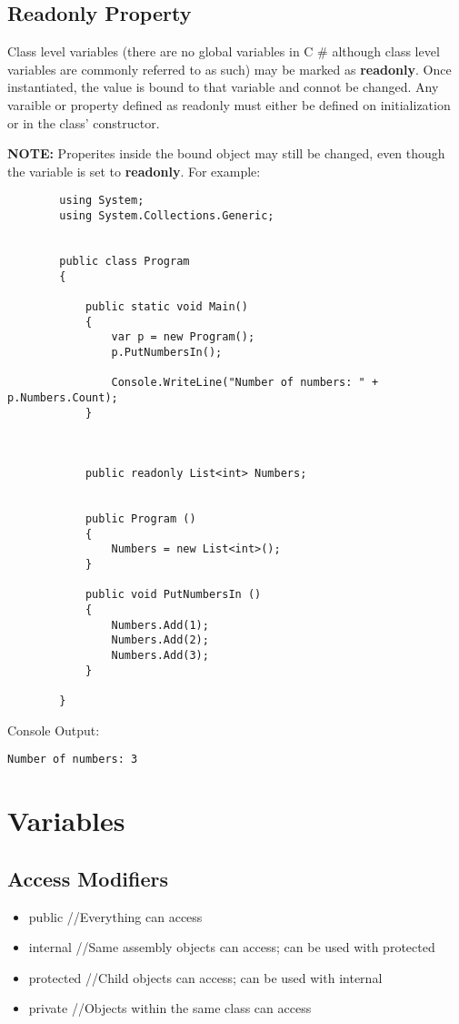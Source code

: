 \documentclass {amsart}
\begin{document}
	\subsection{Readonly Property}  Class level variables (there are no global variables in C \# although class level variables are commonly referred to as such) may be marked as {\bf readonly}.  Once instantiated, the value is bound to that variable and connot be changed.  Any varaible or property defined as readonly must either be defined on initialization or in the class' constructor.
\linebreak

{\bf NOTE:} Properites inside the bound object may still be changed, even though the variable is set to {\bf readonly}.  For example: 

	\begin{lstlisting}
		using System;
		using System.Collections.Generic;

							
		public class Program
		{

			public static void Main()
			{
				var p = new Program();
				p.PutNumbersIn();
				
				Console.WriteLine("Number of numbers: " + p.Numbers.Count);
			}

			
				
			public readonly List<int> Numbers; 


			public Program () 
			{
				Numbers = new List<int>();	
			}

			public void PutNumbersIn () 
			{
				Numbers.Add(1);
				Numbers.Add(2);
				Numbers.Add(3);
			}
			
		}
	\end{lstlisting}
	Console Output: 
	\begin{verbatim}Number of numbers: 3\end{verbatim}
\section{Variables}
	\subsection{Access Modifiers}
		\begin{itemize}
			\item public 		//Everything can access
			\item internal 	//Same assembly objects can access; can be used with protected
			\item protected	//Child objects can access; can be used with internal
			\item private		//Objects within the same class can access
		\end{itemize}
\end{document}

